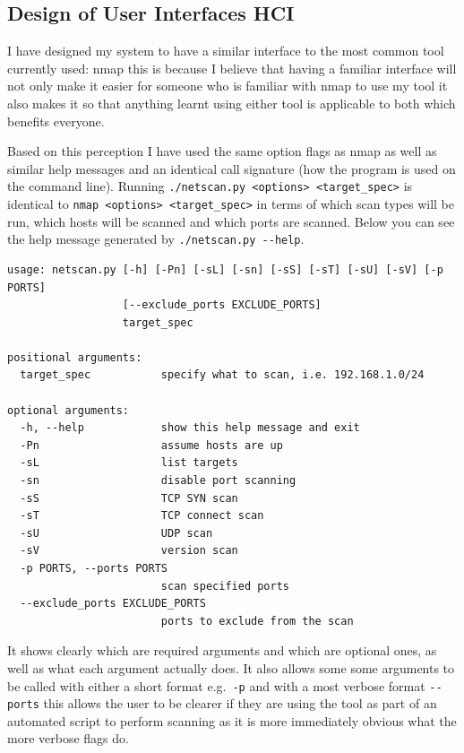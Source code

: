 \documentclass[titlepage]{article}
\let\Oldsubsection\subsection{}
\renewcommand{\subsection}{\FloatBarrier\Oldsubsection}
\begin{document}
\subsection{Design of User Interfaces HCI}

I have designed my system to have a similar interface to the most common tool currently used: nmap 
this is because I believe that having a familiar interface will not only make it easier for someone 
who is familiar with nmap to use my tool it also makes it so that anything learnt using either tool 
is applicable to both which benefits everyone.

Based on this perception I have used the same option flags as nmap as well as similar help messages 
and an identical call signature (how the program is used on the command line). Running 
\verb|./netscan.py <options> <target_spec>| is identical to \verb|nmap <options> <target_spec>| in 
terms of which scan types will be run, which hosts will be scanned and which \glspl{port} are 
scanned. Below you can see the help message generated by \verb|./netscan.py --help|.

\begin{verbatim}
usage: netscan.py [-h] [-Pn] [-sL] [-sn] [-sS] [-sT] [-sU] [-sV] [-p PORTS]
                  [--exclude_ports EXCLUDE_PORTS]
                  target_spec

positional arguments:
  target_spec           specify what to scan, i.e. 192.168.1.0/24

optional arguments:
  -h, --help            show this help message and exit
  -Pn                   assume hosts are up
  -sL                   list targets
  -sn                   disable port scanning
  -sS                   TCP SYN scan
  -sT                   TCP connect scan
  -sU                   UDP scan
  -sV                   version scan
  -p PORTS, --ports PORTS
                        scan specified ports
  --exclude_ports EXCLUDE_PORTS
                        ports to exclude from the scan
\end{verbatim}

It shows clearly which are required arguments and which are optional ones, as well as what
each argument actually does. It also allows some some arguments to be called with either
a short format e.g.\ \verb|-p| and with a most verbose format \verb|--ports| this allows
the user to be clearer if they are using the tool as part of an automated script to perform
scanning as it is more immediately obvious what the more verbose flags do.
\end{document}
